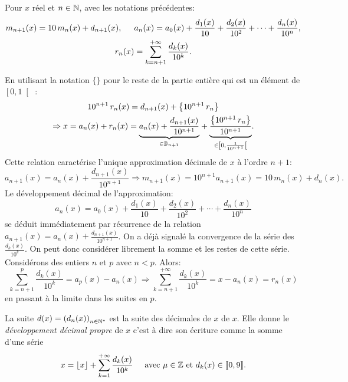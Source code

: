 \begin{propn} \label{devdec}
 Pour $x$ réel et $n\in \mathbb{N}$, avec les notations précédentes:
\begin{multline*}
 m_{n+1}(x) = 10\,m_n(x) + d_{n+1}(x),\hspace{0.5cm}
 a_n(x) = a_0(x) + \frac{d_1(x)}{10} + \frac{d_2(x)}{10^2} + \cdots + \frac{d_n(x)}{10^n}, \\
 r_n(x) = \sum_{k = n+1}^{+\infty} \frac{d_k(x)}{10^k}.
\end{multline*}
\end{propn}
\begin{demo}
En utilisant la notation $\{ \}$ pour le reste de la partie entière qui est un élément de $\left[ 0,1\right[$ :
\begin{multline*}
 10^{n+1}\, r_n(x) = d_{n+1}(x) + \left\lbrace 10^{n+1}\, r_n\right\rbrace \\
 \Rightarrow 
 x = a_n(x) + r_n(x) 
 = \underset{ \in \mathbb{D}_{n+1}}{\underbrace{a_n(x) + \frac{d_{n+1}(x)}{10^{n+1}}}} 
 + \underset{\in \left[ 0,\frac{1}{10^{n+1}}\right[ }{\underbrace{\frac{\left\lbrace 10^{n+1}\, r_n\right\rbrace}{10^{n+1}}}}. 
\end{multline*}
Cette relation caractérise l'unique approximation décimale de $x$ à l'ordre $n+1$:
\[
 a_{n+1}(x) = a_n(x) + \frac{d_{n+1}(x)}{10^{n+1}}
 \Rightarrow
 m_{n+1}(x) = 10^{n+1}a_{n+1}(x) = 10\, m_n(x) + d_n(x).
\]
Le développement décimal de l'approximation:
\[
 a_n(x) = a_0(x) + \frac{d_1(x)}{10} + \frac{d_2(x)}{10^2} + \cdots + \frac{d_n(x)}{10^n}
\]
se déduit immédiatement par récurrence de la relation $a_{n+1}(x) = a_n(x) + \frac{d_{n+1}(x)}{10^{n+1}}$.\newline
On a déjà signalé la convergence de la série des $\frac{d_k(x)}{10^{k}}$. On peut donc considérer librement la somme et les restes de cette série. Considérons des entiers $n$ et $p$ avec $n < p$. Alors:
\[
 \sum_{k=n+1}^{p}\frac{d_k(x)}{10^{k}} = a_p(x) - a_n(x)
 \Rightarrow
 \sum_{k=n+1}^{+ \infty}\frac{d_k(x)}{10^{k}} = x - a_n(x) = r_n(x)
\]
en passant à la limite dans les suites en $p$.
\end{demo}
\begin{defi}
La suite $d(x) = \left( d_n(x)\right)_{n\in \mathbb{N}^*}$ est la suite des décimales de $x$  de $x$. Elle donne le \emph{développement décimal propre} de $x$ c'est à dire son écriture comme la somme d'une série
\[
 x = \lfloor x \rfloor + \sum_{k=1}^{+\infty} \frac{d_k(x)}{10^k} \hspace{0.5cm} \text{avec } \mu \in \mathbb{Z} \text{ et } d_k(x) \in \llbracket 0,9 \rrbracket.
\] 
\end{defi}

